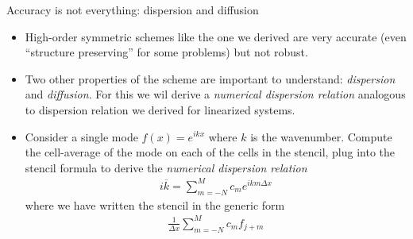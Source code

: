 \documentclass[aspectratio=169]{beamer}
\newcommand{\mypause}{\pause}
\begin{document}
\begin{frame}{Accuracy is not everything: dispersion and diffusion}
  \footnotesize
  \begin{itemize}
  \item High-order symmetric schemes like the one we derived are very
    accurate (even ``structure preserving'' for some problems) but not
    robust.
    \mypause%
  \item Two other properties of the scheme are important to
    understand: \emph{dispersion} and \emph{diffusion}. For this we
    wil derive a \emph{numerical dispersion relation} analogous to
    dispersion relation we derived for linearized systems.
    \mypause%
  \item Consider a single mode $f(x) = e^{ik x}$ where $k$ is the
    wavenumber. Compute the cell-average of the mode on each of the
    cells in the stencil, plug into the stencil formula to derive the
    \emph{numerical dispersion relation}
    \begin{align*}
      i\overline{k} = \sum_{m=-N}^{M} c_m e^{i k m \Delta x}
    \end{align*}
    where we have written the stencil in the generic form
    \begin{align*}
      \frac{1}{\Delta x}\sum_{m = -N}^{M} c_m f_{j+m}
    \end{align*}

  \end{itemize}
\end{frame}
\end{document}
